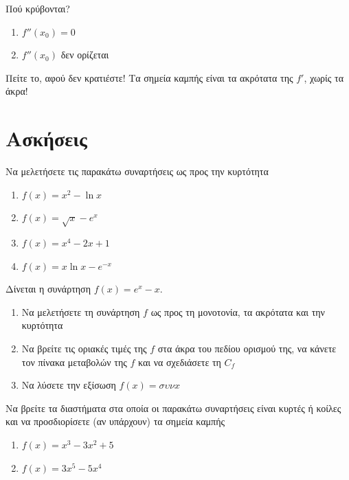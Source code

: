 \documentclass{presentation}
\begin{document}
\begin{frame}{Πού κρύβονται?}
  \begin{enumerate}
    \item<1-> $f''(x_0)=0$
    \item<2-> $f''(x_0)$ δεν ορίζεται
  \end{enumerate}
   {Πείτε το, αφού δεν κρατιέστε! Τα σημεία καμπής είναι τα ακρότατα της $f'$, χωρίς τα άκρα!}
\end{frame}

\section{Ασκήσεις}
\begin{askisi}
  Να μελετήσετε τις παρακάτω συναρτήσεις ως προς την κυρτότητα
  \begin{enumerate}
    \item<1-> $f(x)=x^2-\ln x$
    \item<2-> $f(x)=\sqrt{x}-e^x$
    \item<3-> $f(x)=x^4-2x+1$
    \item<4-> $f(x)=x\ln x-e^{-x}$
  \end{enumerate}

\end{askisi}

\begin{askisi}
  Δίνεται η συνάρτηση $f(x)=e^x-x$.
  \begin{enumerate}
    \item<1-> Να μελετήσετε τη συνάρτηση $f$ ως προς τη μονοτονία, τα ακρότατα και την κυρτότητα
    \item<2-> Να βρείτε τις οριακές τιμές της $f$ στα άκρα του πεδίου ορισμού της, να κάνετε τον πίνακα μεταβολών της $f$ και να σχεδιάσετε τη $C_f$
    \item<3-> Να λύσετε την εξίσωση $f(x)=συνx$
  \end{enumerate}

\end{askisi}

\begin{askisi}
  Να βρείτε τα διαστήματα στα οποία οι παρακάτω συναρτήσεις είναι κυρτές ή κοίλες και να προσδιορίσετε (αν υπάρχουν) τα σημεία καμπής
  \begin{enumerate}
    \item<1-> $f(x)=x^3-3x^2+5$
    \item<2-> $f(x)=3x^5-5x^4$
  \end{enumerate}

\end{askisi}
\end{document}
